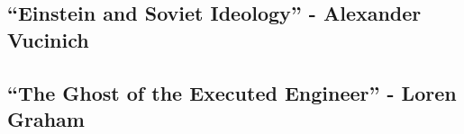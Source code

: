 \subsection{``Einstein and Soviet Ideology'' - Alexander Vucinich}

\subsection{``The Ghost of the Executed Engineer'' - Loren Graham}

